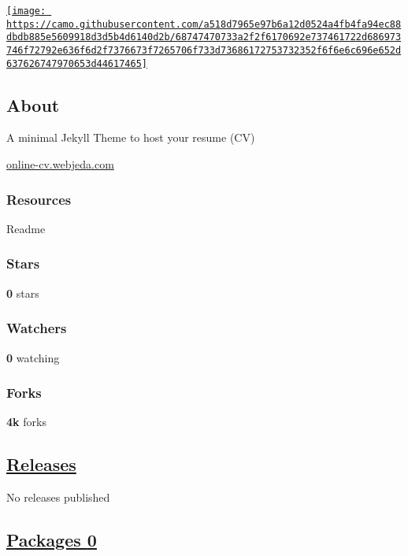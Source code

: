 \documentclass[english,]{article}
\begin{document}
\href{https://star-history.com/\#sharu725/online-cv\&Date}{\texttt{[image: https://camo.githubusercontent.com/a518d7965e97b6a12d0524a4fb4fa94ec88dbdb885e5609918d3d5b4d6140d2b/68747470733a2f2f6170692e737461722d686973746f72792e636f6d2f7376673f7265706f733d73686172753732352f6f6e6c696e652d637626747970653d44617465]}}

\hypertarget{about}{%
\subsection{About}\label{about}}

A minimal Jekyll Theme to host your resume (CV)

{ \href{https://online-cv.webjeda.com}{online-cv.webjeda.com} }

\hypertarget{resources}{%
\subsubsection{Resources}\label{resources}}

Readme

\hypertarget{stars}{%
\subsubsection{Stars}\label{stars}}

\textbf{0} stars

\hypertarget{watchers}{%
\subsubsection{Watchers}\label{watchers}}

\textbf{0} watching

\hypertarget{forks}{%
\subsubsection{Forks}\label{forks}}

\textbf{4k} forks

\hypertarget{releases}{%
\subsection{\texorpdfstring{\href{/alexpoulis/online-cv/releases}{Releases}}{Releases}}\label{releases}}

No releases published

\hypertarget{packages-0}{%
\subsection{\texorpdfstring{\href{/users/alexpoulis/packages?repo_name=online-cv}{Packages
{0}}}{Packages 0}}\label{packages-0}}
\end{document}
